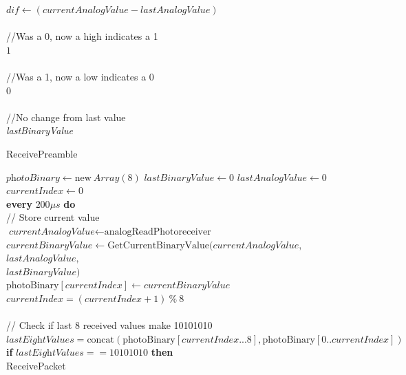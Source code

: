 \documentclass[letterpaper,10pt]{article}
\begin{document}
\begin{spacing}{1.15}
\begin{algorithm}[H]
\begin{algorithmic}[1]
		\State $\textit{dif} \gets (\textit{currentAnalogValue} - \textit{lastAnalogValue})$\\\\
		
		
		//Was a 0, now a high indicates a 1
		 \\
		\quad \Return $1$\\\\
		
		//Was a 1, now a low indicates a 0
		 \\
		\quad \Return $0$\\\\
		
		//No change from last value
		\Else\\
		\quad \Return \textit{lastBinaryValue}
		\EndIf
	\end{algorithmic}
\end{algorithm}

\begin{algorithm}[H]
	\caption{ReceivePreamble}\label{algo-2}
	\begin{algorithmic}[1]
		\State $\textit{photoBinary} \gets \text{new}\ \textit{Array}(8)$
		\State $\textit{lastBinaryValue} \gets 0$
		\State $\textit{lastAnalogValue} \gets 0$
		\State $currentIndex \gets 0$\\
		
		\State \textbf{every} $200 \mu s$ \textbf{do}\\
		\quad // Store current value\\
		\quad $\textit{currentAnalogValue} \gets \text{analogReadPhotoreceiver}$\\
		\quad $\textit{currentBinaryValue} \gets \text{GetCurrentBinaryValue}(\textit{currentAnalogValue},$\\ 
		\hspace{7.65cm} $\textit{lastAnalogValue},$\\
		\hspace{7.65cm} $\textit{lastBinaryValue})$ \\
		\quad $\text{photoBinary}[\textit{currentIndex}] \gets \textit{currentBinaryValue}$\\
		\quad $\textit{currentIndex} = (\textit{currentIndex} + 1)\ \%\ 8$\\\\
		
		\quad // Check if last 8 received values make 10101010 
		\State \quad $\textit{lastEightValues} = \text{concat}(\text{photoBinary}[\textit{currentIndex}...8],\text{photoBinary}[0..\textit{currentIndex}])$ \\
		\quad \textbf{if} $\textit{lastEightValues} == 10101010$ \textbf{then}\\
		\quad \quad ReceivePacket\\
		

\end{algorithmic}
\end{algorithm}
\end{spacing}
\end{document}
